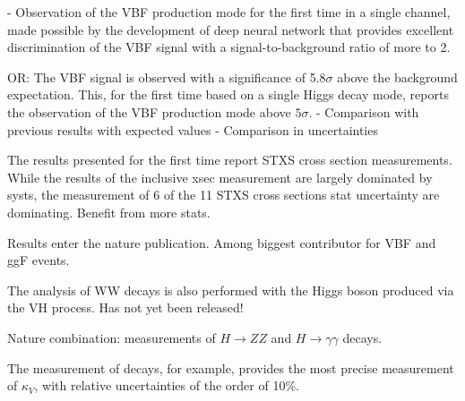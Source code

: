 - Observation of the VBF production mode for the first time in a single channel, made possible by the development of deep neural network that provides excellent discrimination of the VBF signal with a signal-to-background ratio of more to 2. 

OR: The VBF signal is observed with a significance of 5.8$\sigma$ above the background expectation. 
This, for the first time based on a single Higgs decay mode, reports the observation of the VBF production mode above $5\sigma$. 
- Comparison with previous results with expected values
- Comparison in uncertainties



The results presented for the first time report STXS cross section measurements. 
While the results of the inclusive xsec measurement are largely dominated by systs, the measurement of 6 of the 11 STXS cross sections stat uncertainty are dominating. Benefit from more stats. 


Results enter the nature publication. 
Among biggest contributor for VBF and ggF events. 


The analysis of WW decays is also performed with the Higgs boson produced via the VH process. 
Has not yet been released!


Nature combination: measurements of $H \to ZZ$ and $H \to \gamma\gamma$ decays. 

The measurement of \HWW decays, for example, provides the most precise measurement of $\kappa_{V}$, with relative uncertainties of the order of 10\%.



